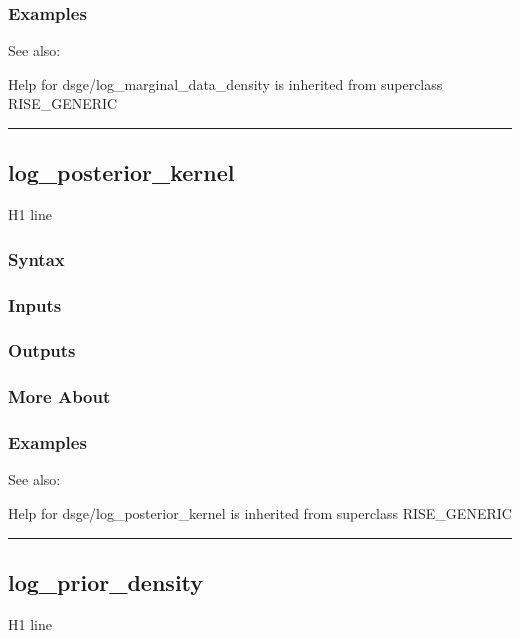 \documentclass[letterpaper,10pt,english]{sphinxmanual}
\begin{document}
\subsubsection{Examples}
\label{classes/models/@dsge/dsge:id91}
See also:

Help for dsge/log\_marginal\_data\_density is inherited from superclass RISE\_GENERIC


\bigskip\hrule{}\bigskip



\subsection{log\_posterior\_kernel}
\label{classes/models/@dsge/dsge:log-posterior-kernel}\label{classes/models/@dsge/dsge:id92}
H1 line


\subsubsection{Syntax}
\label{classes/models/@dsge/dsge:id93}

\subsubsection{Inputs}
\label{classes/models/@dsge/dsge:id94}

\subsubsection{Outputs}
\label{classes/models/@dsge/dsge:id95}

\subsubsection{More About}
\label{classes/models/@dsge/dsge:id96}

\subsubsection{Examples}
\label{classes/models/@dsge/dsge:id97}
See also:

Help for dsge/log\_posterior\_kernel is inherited from superclass RISE\_GENERIC


\bigskip\hrule{}\bigskip



\subsection{log\_prior\_density}
\label{classes/models/@dsge/dsge:id98}\label{classes/models/@dsge/dsge:log-prior-density}
H1 line
\end{document}
